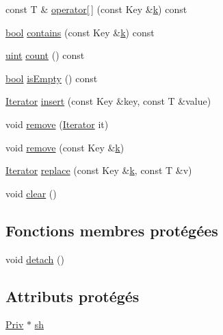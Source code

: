 \begin{DoxyCompactItemize}
const T \& \hyperlink{class_q_map_aaa295bff7b66e5d1b3f726ae4a3803ef}{operator\mbox{[}$\,$\mbox{]}} (const Key \&\hyperlink{060__command__switch_8tcl_a20363f854eb4098a446733d63d34dbc1}{k}) const 
\item 
\hyperlink{qglobal_8h_a1062901a7428fdd9c7f180f5e01ea056}{bool} \hyperlink{class_q_map_a8ab89be062e6a99a7bba0e5d647849c4}{contains} (const Key \&\hyperlink{060__command__switch_8tcl_a20363f854eb4098a446733d63d34dbc1}{k}) const 
\item 
\hyperlink{qglobal_8h_a4d3943ddea65db7163a58e6c7e8df95a}{uint} \hyperlink{class_q_map_afc087b5e81daba1c68085977734ed58c}{count} () const 
\item 
\hyperlink{qglobal_8h_a1062901a7428fdd9c7f180f5e01ea056}{bool} \hyperlink{class_q_map_a33cfb24195273a5e70dcc48644368a99}{is\+Empty} () const 
\item 
\hyperlink{class_q_map_aa920e1d34440b34269b350ab96bd73d0}{Iterator} \hyperlink{class_q_map_a59b52d230332c95b476d1796a167de36}{insert} (const Key \&key, const T \&value)
\item 
void \hyperlink{class_q_map_ab8bbc88a58eaad6384e281c86461d0f4}{remove} (\hyperlink{class_q_map_aa920e1d34440b34269b350ab96bd73d0}{Iterator} it)
\item 
void \hyperlink{class_q_map_a2223f1307c21d160dde58606a9c4377f}{remove} (const Key \&\hyperlink{060__command__switch_8tcl_a20363f854eb4098a446733d63d34dbc1}{k})
\item 
\hyperlink{class_q_map_aa920e1d34440b34269b350ab96bd73d0}{Iterator} \hyperlink{class_q_map_a37e604bb752b9a8aa0a4bfc293b75a38}{replace} (const Key \&\hyperlink{060__command__switch_8tcl_a20363f854eb4098a446733d63d34dbc1}{k}, const T \&v)
\item 
void \hyperlink{class_q_map_a52ef8f9a9c270b1dbf18ccaecdb964a4}{clear} ()
\end{DoxyCompactItemize}
\subsection*{Fonctions membres protégées}
\begin{DoxyCompactItemize}
\item 
void \hyperlink{class_q_map_a6913ba3a784e35a4b0d274f229af92ea}{detach} ()
\end{DoxyCompactItemize}
\subsection*{Attributs protégés}
\begin{DoxyCompactItemize}
\item 
\hyperlink{class_q_map_af63078f1afbbec29ac319ddbd88aefdd}{Priv} $\ast$ \hyperlink{class_q_map_af8bec306bf8ee3e0effffe9a33b6c013}{sh}
\end{DoxyCompactItemize}


